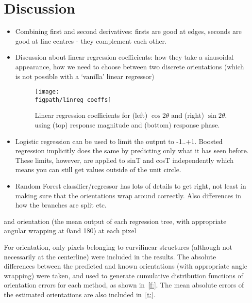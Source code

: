 \section{Discussion}
\label{s:discussion}
\begin{itemize}
\item Combining first and second derivatives: firsts are good at edges, seconds are good at line centres - they complement each other.

\item Discussion about linear regression coefficients: how they take a sinusoidal appearance, how we need to choose between two discrete orientations (which is not possible with a `vanilla' linear regressor)
%
\begin{figure}[t]
	\centering
		\texttt{[image: \\figpath/linreg\_coeffs]}
	\caption{Linear regression coefficients for (left) $\cos 2\theta$ and (right) $\sin 2\theta$, using (top) response magnitude and (bottom) response phase.}
	\label{f:linreg_coeffs}
\end{figure}

\item Logistic regression can be used to limit the output to -1..+1. Boosted regression implicitly does the same by predicting only what it has seen before. These limits, however, are applied to sinT and cosT independently which means you can still get values outside of the unit circle.

\item Random Forest classifier/regressor has lots of details to get right, not least in making sure that the orientations wrap around correctly. Also differences in how the branches are split etc.

\end{itemize}

and orientation (the mean output of each regression tree, with appropriate angular wrapping at 0\deg and 180\deg) at each pixel

For orientation, only pixels belonging to curvilinear structures (although not necessarily at the centerline) were included in the results. The absolute differences between the predicted and known orientations (with appropriate angle wrapping) were taken, and used to generate cumulative distribution functions of orientation errors for each method, as shown in~\ref{f:}. The mean absolute errors of the estimated orientations are also included in~\ref{t:}.

